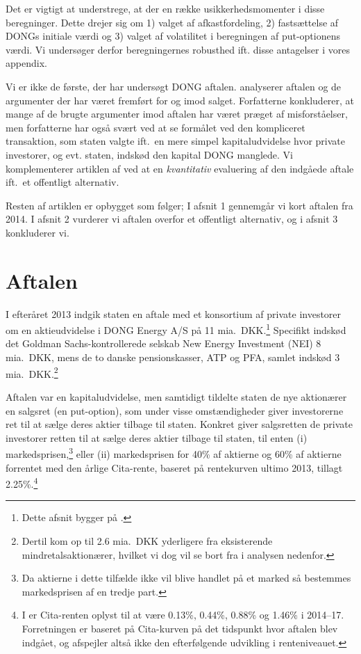 \documentclass{article}
\begin{document}
Det er vigtigt at understrege, at der en række usikkerhedsmomenter i disse beregninger. Dette drejer sig om 1) valget af afkastfordeling, 2) fastsættelse af DONGs initiale værdi og 3) valget af volatilitet i beregningen af put-optionens værdi. Vi undersøger derfor beregningernes robusthed ift. disse antagelser i vores appendix.

Vi er ikke de første, der har undersøgt DONG aftalen. \cite{Bachman2014} analyserer aftalen og de argumenter der har været fremført for og imod salget. Forfatterne konkluderer, at mange af de brugte argumenter imod aftalen har været præget af misforståelser, men forfatterne har også svært ved at se formålet ved den kompliceret transaktion, som staten valgte ift.\ en mere simpel kapitaludvidelse hvor private investorer, og evt. staten, indskød den kapital DONG manglede. Vi komplementerer artiklen af \cite{Bachman2014} ved at en \emph{kvantitativ} evaluering af den indgåede aftale ift.\ et offentligt alternativ. 

Resten af artiklen er opbygget som følger; I afsnit 1 gennemgår vi kort aftalen fra 2014. I afsnit 2 vurderer vi aftalen overfor et offentligt alternativ, og i afsnit 3 konkluderer vi.


\section{Aftalen}
I efteråret 2013 indgik staten en aftale med et konsortium af private investorer om en aktieudvidelse i DONG Energy A/S på 11 mia.\ DKK.\footnote{Dette afsnit bygger på \citet{FM2013a}.} Specifikt indskød det Goldman Sachs-kontrollerede selskab New Energy Investment (NEI) 8 mia.\ DKK, mens de to danske pensionskasser, ATP og PFA, samlet indskød 3 mia.\ DKK.\footnote{Dertil kom op til 2.6 mia.\ DKK yderligere fra eksisterende mindretalsaktionærer, hvilket vi dog vil se bort fra i analysen nedenfor.}

Aftalen var en kapitaludvidelse, men samtidigt tildelte staten de nye aktionærer en salgsret (en put-option), som under visse omstændigheder giver investorerne ret til at sælge deres aktier tilbage til staten. Konkret giver salgsretten de private investorer retten til at sælge deres aktier tilbage til staten,  til enten (i) markedsprisen,\footnote{Da aktierne i dette tilfælde ikke vil blive handlet på et marked så bestemmes markedsprisen af en tredje part.} eller (ii) markedsprisen for 40\% af aktierne og 60\% af aktierne forrentet med den årlige Cita-rente, baseret på rentekurven ultimo 2013, tillagt 2.25\%.\footnote{I \citet{FM2013f} er Cita-renten oplyst til at være 0.13\%, 0.44\%, 0.88\% og 1.46\% i 2014--17. Forretningen er baseret på Cita-kurven på det tidspunkt hvor aftalen blev indgået, og afspejler altså ikke den efterfølgende udvikling i renteniveauet.}
\end{document}
